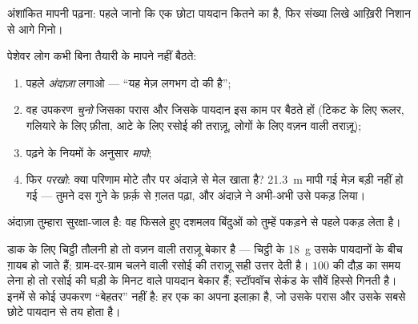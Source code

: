 \begin{omfigure}

{\small अंशांकित मापनी पढ़ना: पहले जानो कि एक छोटा पायदान कितने का
है, फिर संख्या लिखे आख़िरी निशान से आगे गिनो।}
\end{omfigure}

\begin{method}[अंदाज़ा लगाओ, मापो, परखो]\label{met:g6:measurement-in-science:estimate}
पेशेवर लोग कभी बिना तैयारी के मापने नहीं बैठते:
\begin{enumerate}
  \item पहले \emph{अंदाज़ा} लगाओ --- ``यह मेज़ लगभग दो  की
        है'';
  \item वह उपकरण \emph{चुनो} जिसका परास और जिसके पायदान इस काम पर
        बैठते हों (टिकट के लिए रूलर, गलियारे के लिए फ़ीता, आटे के
        लिए रसोई की तराज़ू, लोगों के लिए वज़न वाली तराज़ू);
  \item पढ़ने के नियमों के अनुसार \emph{मापो};
  \item फिर \emph{परखो}: क्या परिणाम मोटे तौर पर अंदाज़े से मेल खाता
        है? \qty{21.3}{m} मापी गई मेज़ बड़ी नहीं हो गई --- तुमने
        दस गुने के फ़र्क़ से ग़लत पढ़ा, और अंदाज़े ने अभी-अभी उसे पकड़
        लिया।
\end{enumerate}
अंदाज़ा तुम्हारा सुरक्षा-जाल है: वह फिसले हुए दशमलव बिंदुओं को तुम्हें
पकड़ने से पहले पकड़ लेता है।
\end{method}

\begin{example}[समझदारी से चुनना]\label{ex:g6:measurement-in-science:choose}
डाक के लिए चिट्ठी तौलनी हो तो वज़न वाली तराज़ू बेकार है --- चिट्ठी के
\qty{18}{g} उसके पायदानों के बीच ग़ायब हो जाते हैं; ग्राम-दर-ग्राम
चलने वाली रसोई की तराज़ू सही उत्तर देती है। $100$  की दौड़ का समय
लेना हो तो रसोई की घड़ी के मिनट वाले पायदान बेकार हैं; स्टॉपवॉच सेकंड
के सौवें हिस्से गिनती है। इनमें से कोई उपकरण ``बेहतर'' नहीं है: हर एक
का अपना इलाक़ा है, जो उसके परास और उसके सबसे छोटे पायदान से तय होता
है।
\end{example}

